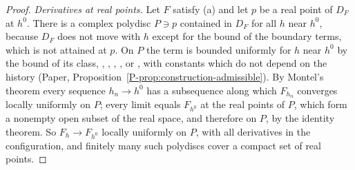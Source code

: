 \documentclass[11pt]{preprint}
\numberwithin{equation}{section}
\theoremstyle{definition}
\theoremstyle{remark}
\theoremstyle{plain}
\begin{document}
\begin{proof}
\emph{Derivatives at real points.} Let $F$ satisfy (a) and let $p$ be a real point of $D_F$ at $h^0$. There is a complex polydisc $P \ni p$ contained in $D_F$ for all $h$ near $h^0$, because $D_F$ does not move with $h$ except for the bound of the boundary terms, which is not attained at $p$. On $P$ the term is bounded uniformly for $h$ near $h^0$ by the bound of its class, \cite[(1.18), p.~263]{BalabanRG1}, \cite[(2.31), p.~260]{BalabanCRE}, \cite[(2.42), p.~261]{BalabanCRE}, \cite[(1.70), p.~192]{BalabanLFR1}, or \cite[(1.11), p.~358, (1.47)--(1.48), p.~368]{BalabanLFR2}, with constants which do not depend on the history (Paper, Proposition~\ref{P-prop:construction-admissible}). By Montel's theorem every sequence $h_n \to h^0$ has a subsequence along which $F_{h_n}$ converges locally uniformly on $P$; every limit equals $F_{h^0}$ at the real points of $P$, which form a nonempty open subset of the real space, and therefore on $P$, by the identity theorem. So $F_h \to F_{h^0}$ locally uniformly on $P$, with all derivatives in the configuration, and finitely many such polydiscs cover a compact set of real points.


\end{proof}
\end{document}
